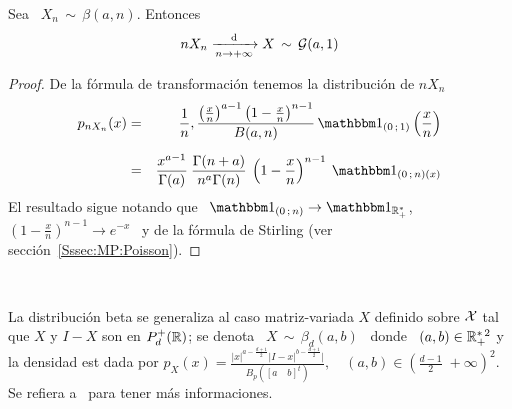 \begin{lema}
\label{Lem:GamaLimiteBeta}
%
  Sea \ $X_n \, \sim \, \beta(a,n)$. Entonces
  \[
  n X_n \xrightarrow[n \to +\infty]{\mathrm{d}} X \, \sim \, \mathcal{G}(a,1)
  \]
\end{lema}
%
\begin{proof}
  De la f\'ormula de transformaci\'on tenemos la distribuci\'on de $n X_n$
  \begin{eqnarray*}
  p_{n X_n}(x) & = & \frac{1}{n} , \frac{\left( \frac{x}{n} \right)^{a-1} \left( 1
  - \frac{x}{n} \right)^{n-1}}{B(a,n)} \, \un_{(0 \; 1)}\left( \frac{x}{n} \right)\\[2mm]
  & = & \frac{x^{a-1}}{\Gamma(a)} \: \frac{\Gamma(n+a)}{n^a \Gamma(n)} \: \left( 1 -
  \frac{x}{n} \right)^{n-1} \: \un_{(0 \; n)(x)}
  \end{eqnarray*}
  El resultado sigue  notando que \ $\un_{(0 \;  n)} \to \un_{\Rset_+^*}$, \quad
  $\left(  1 -  \frac{x}{n} \right)^{n-1}  \to e^{-x}$  \ y  de la  f\'ormula de
  Stirling (ver secci\'on~\ref{Sssec:MP:Poisson}).
\end{proof}

\

La distribuci\'on beta  se generaliza al caso matriz-variada  $X$ definido sobre
$\mathcal{X}$  tal que $X$  y $I-X$  son en  $P_d^+(\mathbb{R})$; se  denota \  $X \,  \sim \,
\beta_d(a,b)$ \ donde \ $(a,b) \in \mathbb{R}_+^{*  \, 2}$ y la densidad est dada por
$\displaystyle   p_X(x)    =   \frac{|x|^{a   -    \frac{d+1}{2}}   |I-x|^{b   -
    \frac{d+1}{2}}|}{B_p\left([a  \quad  b]^t\right)},  \quad (a,b)  \in  \left(
  \frac{d-1}{2} \; +\infty \right)^2$. Se refiera a~\cite[Cap.~5]{GupNag99} para
tener m\'as informaciones.
